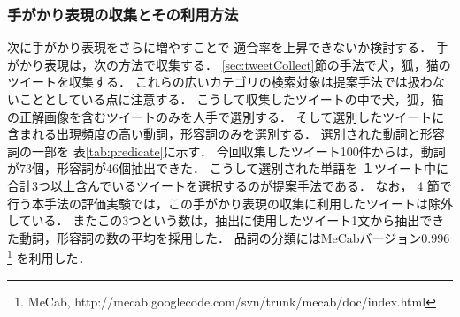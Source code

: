 \documentclass{deimj}
\begin{document}


\subsubsection{手がかり表現の収集とその利用方法}

次に手がかり表現をさらに増やすことで
適合率を上昇できないか検討する．
手がかり表現は，次の方法で収集する．
%
\ref{sec:tweetCollect}節の手法で犬，狐，猫のツイートを収集する．
これらの広いカテゴリの検索対象は提案手法では扱わないこととしている点に注意する．
こうして収集したツイートの中で犬，狐，猫の正解画像を含むツイートのみを人手で選別する．
そして選別したツイートに含まれる出現頻度の高い動詞，形容詞のみを選別する．
選別された動詞と形容詞の一部を
表\ref{tab:predicate}に示す．
今回収集したツイート100件からは，動詞が73個，形容詞が46個抽出できた．
こうして選別された単語を
１ツイート中に合計3つ以上含んでいるツイートを選択するのが提案手法である．
なお，
4
節で行う本手法の評価実験では，この手がかり表現の収集に利用したツイートは除外している．
またこの3つという数は，抽出に使用したツイート1文から抽出できた動詞，形容詞の数の平均を採用した．
品詞の分類にはMeCabバージョン0.996
\footnote{MeCab, http:\slash\slash{}mecab.googlecode.com\slash{}svn\slash{}trunk\slash{}mecab\slash{}doc\slash{}index.html}
を利用した．



\end{document}
